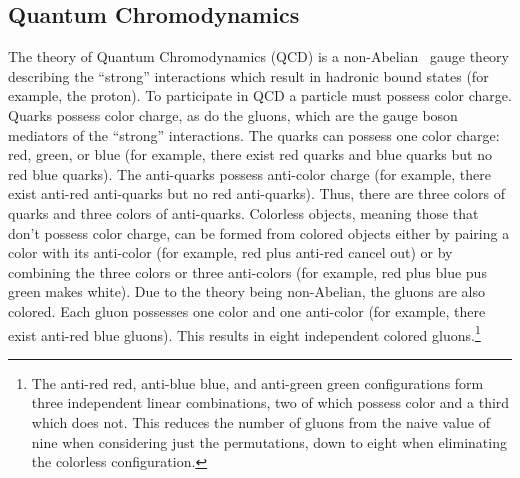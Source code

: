 \subsection{Quantum Chromodynamics}
\label{sec:theory_qcd}


The theory of Quantum Chromodynamics (QCD) is a non-Abelian
\suthree~gauge theory describing the ``strong'' interactions
which result in hadronic bound states (for example, the proton). 
To participate in QCD a particle must possess color charge. 
Quarks possess color charge, as do the gluons, which are the gauge boson
mediators of the ``strong'' interactions. The quarks can possess one color charge:
red, green, or blue
(for example, there exist red quarks and blue quarks but no red blue quarks).
The anti-quarks possess anti-color charge (for example, there exist
anti-red anti-quarks but no red anti-quarks). Thus, there are three colors
of quarks and three colors of anti-quarks.  
Colorless objects, meaning those that don't possess color charge, 
can be formed from colored objects either by pairing
a color with its anti-color (for example, red plus anti-red cancel out) or by 
combining the three colors or three anti-colors  (for example,
red plus blue pus green makes white).
Due to the theory being non-Abelian, the gluons are also colored.
Each gluon possesses one
color and one anti-color (for example, there exist anti-red blue gluons).
This results in eight independent 
colored gluons.\footnote{The anti-red red, anti-blue
blue, and anti-green green configurations 
form three independent linear combinations, two of which possess 
color and a third
which does not. This reduces the number of gluons from the naive
value of nine when considering just the permutations, down to eight
when eliminating the colorless configuration.}


